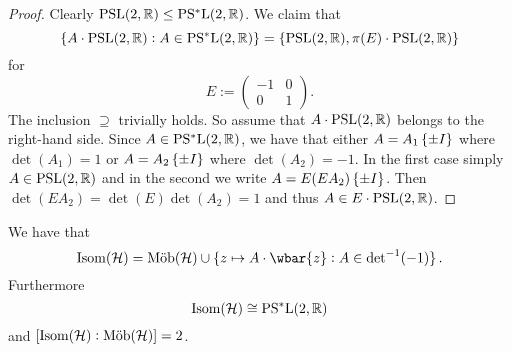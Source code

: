 \begin{proof}
	Clearly $\mathrm{PSL}(2,\mathbb{R}) \leq \mathrm{PS^*L}(2,\mathbb{R})$. We claim that
	\begin{equation*}
		\cbr[0]{A \cdot \PSLrm(2,\Rbb) : A \in \PSLrmstar(2,\Rbb)} = \cbr[0]{\PSLrm(2,\Rbb), \pi(E) \cdot \PSLrm(2,\Rbb)}
	\end{equation*}
	\noindent for 
	\begin{equation*}
		E := \begin{pmatrix}
			-1 & 0\\
			0 & 1
		\end{pmatrix}.
	\end{equation*}
	The inclusion $\supseteq$ trivially holds. So assume that $A \cdot \mathrm{PSL}(2,\mathbb{R})$ belongs to the right-hand side. Since $A \in \mathrm{PS^*L}(2,\mathbb{R})$, we have that either $A = A_1\cbr[0]{\pm I}$ where $\det(A_1) = 1$ or $A = A_2 \cbr[0]{\pm I}$ where $\det(A_2) = -1$. In the first case simply $A \in \mathrm{PSL}(2,\mathbb{R})$ and in the second we write $A = E(EA_2)\cbr[0]{\pm I}$. Then $\det(EA_2) = \det(E)\det(A_2) = 1$ and thus $A \in E \cdot \mathrm{PSL}(2,\mathbb{R})$.
\end{proof}

\begin{theorem}
	We have that
	\begin{equation}
		\Isom(\Hcal) = \Mob(\Hcal) \cup \cbr[0]{z \mapsto A \cdot \wbar{z} : A \in \det^{-1}(-1)}.
	\end{equation}
	Furthermore
	\begin{equation}
		\mathrm{Isom}(\mathcal{H}) \cong \mathrm{PS^*L}(2,\mathbb{R})
	\end{equation}
	\noindent and $\sbr[0]{\Isom(\Hcal) : \Mob(\Hcal)} = 2$.
\end{theorem}

